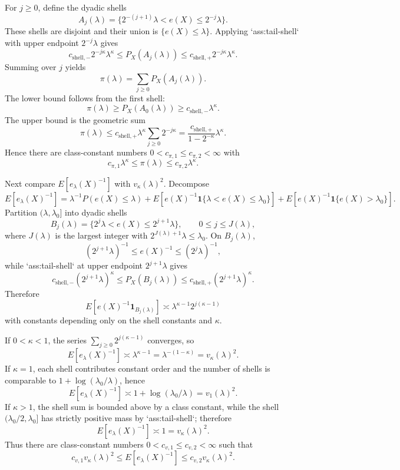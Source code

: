 \documentclass{article}
\begin{document}
For $j\ge 0$, define the dyadic shells
\[
A_j(\lambda)=\{2^{-(j+1)}\lambda<e(X)\le 2^{-j}\lambda\}.
\]
These shells are disjoint and their union is $\{e(X)\le \lambda\}$. Applying
`ass:tail-shell` with upper endpoint $2^{-j}\lambda$ gives
\[
c_{\mathrm{shell},-}2^{-j\kappa}\lambda^\kappa
\le P_X(A_j(\lambda))
\le c_{\mathrm{shell},+}2^{-j\kappa}\lambda^\kappa .
\]
Summing over $j$ yields
\[
\pi(\lambda)=\sum_{j\ge 0}P_X(A_j(\lambda)).
\]
The lower bound follows from the first shell:
\[
\pi(\lambda)\ge P_X(A_0(\lambda))\ge c_{\mathrm{shell},-}\lambda^\kappa.
\]
The upper bound is the geometric sum
\[
\pi(\lambda)\le c_{\mathrm{shell},+}\lambda^\kappa\sum_{j\ge 0}2^{-j\kappa}
=\frac{c_{\mathrm{shell},+}}{1-2^{-\kappa}}\lambda^\kappa.
\]
Hence there are class-constant numbers $0<c_{\pi,1}\le c_{\pi,2}<\infty$ with
\[
c_{\pi,1}\lambda^\kappa\le \pi(\lambda)\le c_{\pi,2}\lambda^\kappa.
\]

Next compare $E[e_\lambda(X)^{-1}]$ with $v_\kappa(\lambda)^2$. Decompose
\[
E[e_\lambda(X)^{-1}]
=\lambda^{-1}P(e(X)\le\lambda)
+E[e(X)^{-1}\mathbf 1\{\lambda<e(X)\le\lambda_0\}]
+E[e(X)^{-1}\mathbf 1\{e(X)>\lambda_0\}].
\]
Partition $(\lambda,\lambda_0]$ into dyadic shells
\[
B_j(\lambda)=\{2^j\lambda<e(X)\le 2^{j+1}\lambda\},\qquad 0\le j\le J(\lambda),
\]
where $J(\lambda)$ is the largest integer with $2^{J(\lambda)+1}\lambda\le \lambda_0$.
On $B_j(\lambda)$,
\[
(2^{j+1}\lambda)^{-1}\le e(X)^{-1}\le (2^j\lambda)^{-1},
\]
while `ass:tail-shell` at upper endpoint $2^{j+1}\lambda$ gives
\[
c_{\mathrm{shell},-}(2^{j+1}\lambda)^\kappa
\le P_X(B_j(\lambda))
\le c_{\mathrm{shell},+}(2^{j+1}\lambda)^\kappa.
\]
Therefore
\[
E[e(X)^{-1}\mathbf 1_{B_j(\lambda)}]\asymp \lambda^{\kappa-1}2^{j(\kappa-1)}
\]
with constants depending only on the shell constants and $\kappa$.

If $0<\kappa<1$, the series $\sum_{j\ge 0}2^{j(\kappa-1)}$ converges, so
\[
E[e_\lambda(X)^{-1}]\asymp \lambda^{\kappa-1}
=\lambda^{-(1-\kappa)}=v_\kappa(\lambda)^2.
\]
If $\kappa=1$, each shell contributes constant order and the number of shells is comparable to
$1+\log(\lambda_0/\lambda)$, hence
\[
E[e_\lambda(X)^{-1}]\asymp 1+\log(\lambda_0/\lambda)=v_1(\lambda)^2.
\]
If $\kappa>1$, the shell sum is bounded above by a class constant, while the shell
$(\lambda_0/2,\lambda_0]$ has strictly positive mass by `ass:tail-shell`; therefore
\[
E[e_\lambda(X)^{-1}]\asymp 1=v_\kappa(\lambda)^2.
\]
Thus there are class-constant numbers $0<c_{v,1}\le c_{v,2}<\infty$ such that
\[
c_{v,1}v_\kappa(\lambda)^2\le E[e_\lambda(X)^{-1}]\le c_{v,2}v_\kappa(\lambda)^2.
\]
\end{document}
